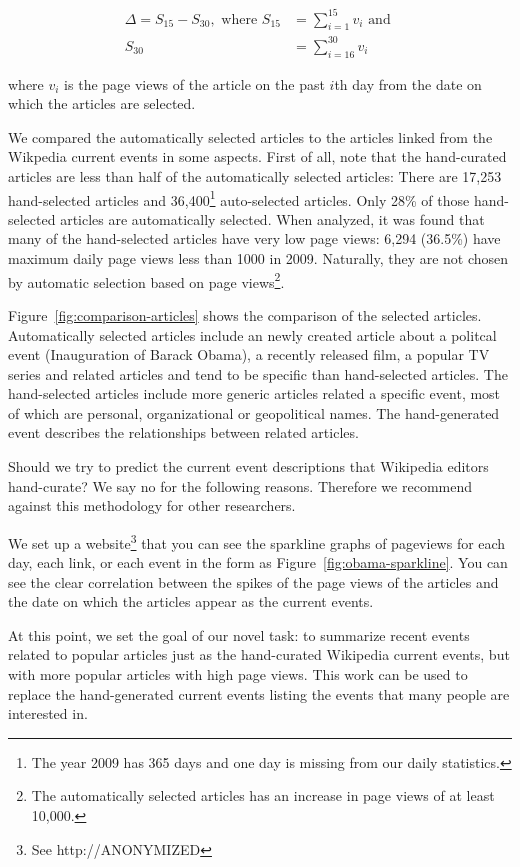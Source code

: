 \documentclass[11pt]{article}
\newcommand{\war}[1]{{\sf\small #1}}
\begin{document}
\begin{align*}
\Delta = S_{15} - S_{30}, \mbox{ where } S_{15} & = \sum_{i=1}^{15} v_i \mbox{ and }\\
S_{30} & = \sum_{i=16}^{30} v_i
\end{align*}

where $v_i$ is the page views of the article on the past $i$th day from the date on which the articles are selected.

We compared the automatically selected articles to the articles linked from the Wikpedia current events in some aspects. First of all, note that the hand-curated articles are less than half of the automatically selected articles: There are 17,253 hand-selected articles and 36,400\footnote{The year 2009 has 365 days and one day is missing from our daily statistics.} auto-selected articles. Only 28\% of those hand-selected articles are automatically selected. When analyzed, it was found that many of the hand-selected articles have very low page views: 6,294 (36.5\%) have maximum daily page views less than 1000 in 2009. Naturally, they are not chosen by automatic selection based on page views\footnote{The automatically selected articles has an increase in page views of at least 10,000.}.

Figure~\ref{fig:comparison-articles} shows the comparison of the selected articles. Automatically selected articles include an newly created article about a politcal event (\war{Inauguration of Barack Obama}), a recently released film, a popular TV series and related articles and tend to be specific than hand-selected articles. The hand-selected articles include more generic articles related a specific event, most of which are personal, organizational or geopolitical names. The hand-generated event describes the relationships between related articles.

Should we try to predict the current event descriptions that Wikipedia editors hand-curate? We say no for the following reasons. Therefore we recommend against this methodology for other researchers.

We set up a website\footnote{See http://ANONYMIZED} that you can see the sparkline graphs of pageviews for each day, each link, or each event in the form as Figure~\ref{fig:obama-sparkline}. You can see the clear correlation between the spikes of the page views of the articles and the date on which the articles appear as the current events.

At this point, we set the goal of our novel task: to summarize recent events related to popular articles just as the hand-curated Wikipedia current events, but with more popular articles with high page views. This work can be used to replace the hand-generated current events listing the events that many people are interested in.
\end{document}
